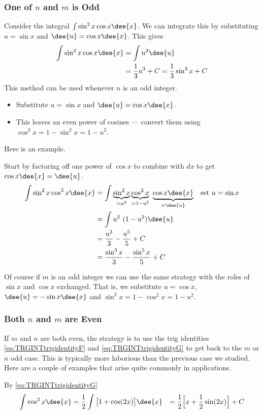 \subsubsection*{One of $n$ and $m$ is Odd}
Consider the integral $\int \sin^2x \cos x\dee{x}$. We can integrate this by substituting
$u=\sin x$ and $\dee{u}=\cos x \dee{x}$. This gives
\begin{align*}
  \int \sin^2x \cos x\dee{x} &= \int u^2 \dee{u} \\
  &= \frac{1}{3}u^3+C = \frac{1}{3}\sin^3x +C
\end{align*}
This method can be used whenever $n$ is an odd integer.
\begin{itemize}
 \item Substitute $u=\sin x$ and $\dee{u}=\cos x\dee{x}$.
 \item This leaves an even power of cosines --- convert them using $\cos^2x = 1-\sin^2x
= 1-u^2$.
\end{itemize}
Here is an example.
\begin{eg}\label{eg:TRGINTa}
Start by factoring off one power of $\cos x$ to combine with $dx$
to get $\cos x\dee{x}=\dee{u}$.
\begin{align*}
\int \sin^2 x\cos^3 x\dee{x}
&= \int \underbrace{\sin^2 x}_{=u^2}\underbrace{\cos^2 x}_{=1-u^2}\ \underbrace{\cos
x\dee{x}}_{=\dee{u}} & \text{set $u=\sin x$}\\
&= \int u^2\ (1-u^2)\dee{u}\\
&=\frac{u^3}{3}-\frac{u^5}{5}+C \\
&=\frac{\sin^3x}{3}-\frac{\sin^5x}{5}+C
\end{align*}
\end{eg}
Of course if $m$ is an odd integer we can use the same strategy with the
roles of $\sin x$ and $\cos x$ exchanged. That is, we substitute
$u=\cos x$, $\dee{u}=-\sin x\dee{x}$ and $\sin^2 x=1-\cos^2x=1-u^2$.

\subsubsection*{Both $n$ and $m$ are Even}
If $m$ and $n$ are both even, the strategy is to use the trig identities
\eqref{eq:TRGINTtrigidentityF} and \eqref{eq:TRGINTtrigidentityG}
to get back to the $m$ or $n$ odd case. This is typically more laborious than the
previous case we studied. Here are a couple of examples that arise quite commonly in
applications.
\begin{eg}\label{eg:TRGINTb}
By \eqref{eq:TRGINTtrigidentityG}
\begin{alignat*}{3}
\int \cos^2 x\dee{x}
&= \frac{1}{2}\int \big[1+\cos(2x)\big]\dee{x}  %
&= \frac{1}{2} \Big[x+\frac{1}{2}\sin(2x)\Big] + C
\end{alignat*}
\end{eg}

